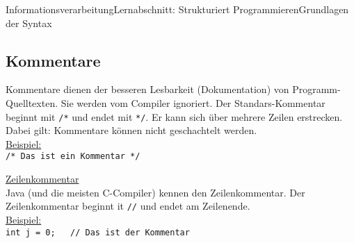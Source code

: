 \documentclass[11pt,oneside,openany,headings=optiontotoc,11pt,numbers=noenddot]{article}
\begin{document}
\begin{worksheet}{Informationsverarbeitung}{Lernabschnitt: Strukturiert Programmieren}{Grundlagen der Syntax}
		\subsection{Kommentare}
		Kommentare dienen der besseren Lesbarkeit (Dokumentation) von Programm-Quelltexten. Sie werden vom Compiler ignoriert. Der Standars-Kommentar beginnt mit \lstinline[style=JavaInputStyle]|/*| und endet mit \lstinline[style=JavaInputStyle]|*/|. Er kann sich über mehrere Zeilen erstrecken. Dabei gilt: Kommentare können nicht geschachtelt werden.\\
		\underline{Beispiel:}\\
		\lstinline[style=JavaInputStyle]|/* Das ist ein Kommentar */|\\
		\par\noindent
		\underline{Zeilenkommentar}\\
		Java (und die meisten C-Compiler) kennen den Zeilenkommentar. Der Zeilenkommentar beginnt it \lstinline[style=JavaInputStyle]|//| und endet am Zeilenende.\\
		\underline{Beispiel:}\\
		\lstinline[style=JavaInputStyle]|int j = 0;   // Das ist der Kommentar|
	\end{worksheet}
\end{document}
